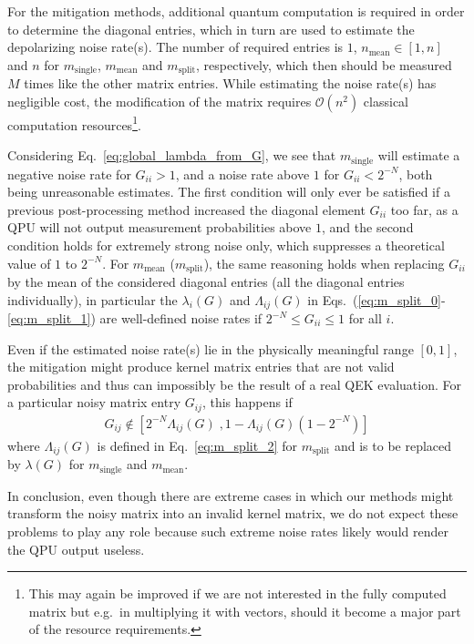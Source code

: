 \documentclass[twocolumn,superscriptaddress,nofootinbib]{revtex4-2}
\begin{document}
For the mitigation methods, additional quantum computation is required in order to determine the diagonal entries, which in turn are used to estimate the depolarizing noise rate(s).
The number of required entries is $1$, $n_\mathrm{mean}\in[1,n]$ and $n$ for $m_\mathrm{single}$, $m_\mathrm{mean}$ and $m_\mathrm{split}$, respectively, which then should be measured $M$ times like the other matrix entries.
While estimating the noise rate(s) has negligible cost, the modification of the matrix requires $\mathcal{O}(n^2)$ classical computation resources\footnote{This may again be improved if we are not interested in the fully computed matrix but e.g.~in multiplying it with vectors, should it become a major part of the resource requirements.}.

Considering Eq.~\eqref{eq:global_lambda_from_G}, we see that $m_\mathrm{single}$ will estimate a negative noise rate for $G_{ii}>1$, and a noise rate above $1$ for $G_{ii}<2^{-N}$, both being unreasonable estimates.
The first condition will only ever be satisfied if a previous post-processing method increased the diagonal element $G_{ii}$ too far, as a QPU will not output measurement probabilities above $1$, and the second condition holds for extremely strong noise only, which suppresses a theoretical value of $1$ to  $2^{-N}$.
For $m_\mathrm{mean}$ ($m_\mathrm{split}$), the same reasoning holds when replacing $G_{ii}$ by the mean of the considered diagonal entries (all the diagonal entries individually), in particular the $\lambda_i(G)$ and $\Lambda_{ij}(G)$ in Eqs.~(\ref{eq:m_split_0}-\ref{eq:m_split_1}) are well-defined noise rates if $2^{-N}\leq G_{ii}\leq 1$ for all $i$.

Even if the estimated noise rate(s) lie in the physically meaningful range $[0,1]$, the mitigation might produce kernel matrix entries that are not valid probabilities and thus can impossibly be the result of a real \ac{QEK} evaluation.
For a particular noisy matrix entry $G_{ij}$, this happens if 
\begin{align}
G_{ij}\not\in \left[2^{-N}\Lambda_{ij}(G)\;, 1-\Lambda_{ij}(G)(1-2^{-N})\right]
\end{align}
where $\Lambda_{ij}(G)$ is defined in Eq.~\eqref{eq:m_split_2} for $m_\mathrm{split}$ and is to be replaced by $\lambda(G)$ for $m_\mathrm{single}$ and $m_\mathrm{mean}$.

In conclusion, even though there are extreme cases in which our methods might transform the noisy matrix into an invalid kernel matrix, we do not expect these problems to play any role because such extreme noise rates likely would render the QPU output useless.
\end{document}
